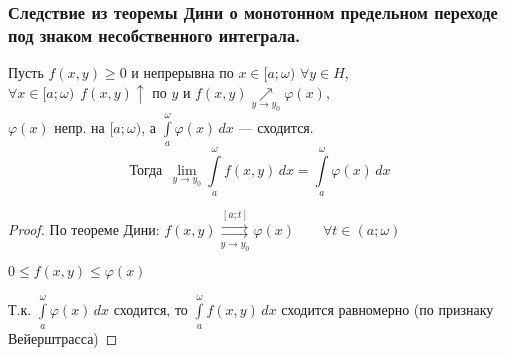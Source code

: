 \subsubsection{Следствие из теоремы Дини о монотонном предельном переходе под знаком несобственного интеграла.}
\begin{corollary}
    Пусть $f(x, y) \ge 0$ и непрерывна по $x \in [a; \omega)$ $\forall y \in H$, \\
    \phantom{Пусть} $\forall x \in [a; \omega) \ \ f(x, y) \uparrow$ по $y$ и $f(x, y) \underset{y \to y_0}{\nearrow} 
    \varphi(x)$, \\
    \phantom{Пусть} $\varphi(x)$ непр. на $[a; \omega)$, а $\int\limits_a^{\omega} \varphi(x)\,dx$ --- сходится.
    \[ \text{Тогда} \ \ \lim_{y \to y_0} \int\limits_a^{\omega} f(x, y)\,dx = \int\limits_a^{\omega} \varphi(x)\,dx \]
\end{corollary}
\begin{proof}
    По теореме Дини: $f(x, y) \overset{[a; t]}{\underset{y \to y_0}{\rightrightarrows}} \varphi(x) \qquad
    \forall t \in (a; \omega)$
    
    $0 \le f(x, y) \le \varphi(x)$
    
    Т.к. $\int\limits_a^{\omega} \varphi(x)\,dx$ сходится, то $\int\limits_a^{\omega} f(x, y)\,dx$ сходится равномерно (по признаку Вейерштрасса) 
\end{proof}

